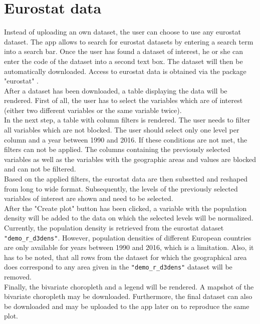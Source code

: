 \documentclass[a4paper,10pt, onecolumn]{article}\usepackage[]{graphicx}\usepackage[]{color}
\begin{document}

\section{Eurostat data}

Instead of uploading an own dataset, the user can choose to use any eurostat dataset. The app allows to search for eurostat datasets by entering a search term into a search bar. Once the user has found a dataset of interest, he or she can enter the code of the dataset into a second text box. The dataset will then be automatically downloaded. Access to eurostat data is obtained via the package "eurostat" \cite{Lahti.2017}. \\
\hspace*{2em} After a dataset has been downloaded, a table displaying the data will be rendered. First of all, the user has to select the variables which are of interest (either two different variables or the same variable twice). \\
\hspace*{2em} In the next step, a table with column filters is rendered. The user needs to filter all variables which are not blocked. The user should select only one level per column and a year between 1990 and 2016. If these conditions are not met, the filters can not be applied. The columns containing the previously selected variables as well as the variables with the geographic areas and values are blocked and can not be filtered. \\ 
\hspace*{2em} Based on the applied filters, the eurostat data are then subsetted and reshaped from long to wide format. Subsequently, the levels of the previously selected variables of interest are shown and need to be selected. \\
\hspace*{2em} After the "Create plot" button has been clicked, a variable with the population density will be added to the data on which the selected levels will be normalized. Currently, the population density is retrieved from the eurostat dataset \verb!"demo_r_d3dens"!. However, population densities of different European countries are only available for years between 1990 and 2016, which is a limitation. Also, it has to be noted, that all rows from the dataset for which the geographical area does correspond to any area given in the \verb!"demo_r_d3dens"! dataset will be removed.\\
\hspace*{2em} Finally, the bivariate choropleth and a legend will be rendered. A mapshot of the bivariate choropleth may be downloaded. Furthermore, the final dataset can also be downloaded and may be uploaded to the app later on to reproduce the same plot.
\end{document}
